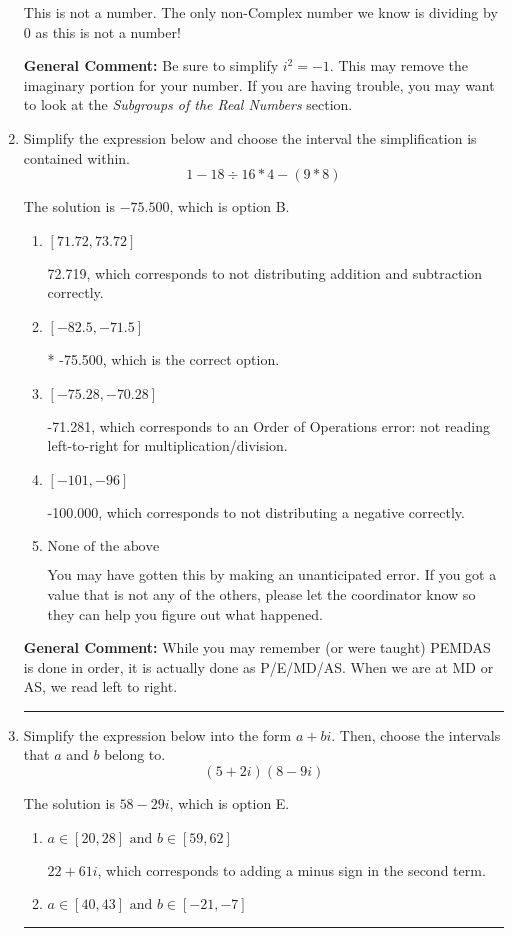 \documentclass{extbook}[14pt]
\newcommand{\litem}[1]{\item #1

\rule{\textwidth}{0.4pt}}
\begin{document}
\begin{enumerate}
{\begin{enumerate}[label=\Alph*.]
This is not a number. The only non-Complex number we know is dividing by 0 as this is not a number!
\end{enumerate}

\textbf{General Comment:} Be sure to simplify $i^2 = -1$. This may remove the imaginary portion for your number. If you are having trouble, you may want to look at the \textit{Subgroups of the Real Numbers} section.
}
\litem{
Simplify the expression below and choose the interval the simplification is contained within.
\[ 1 - 18 \div 16 * 4 - (9 * 8) \]

The solution is \( -75.500 \), which is option B.\begin{enumerate}[label=\Alph*.]
\item \( [71.72, 73.72] \)

 72.719, which corresponds to not distributing addition and subtraction correctly.
\item \( [-82.5, -71.5] \)

* -75.500, which is the correct option.
\item \( [-75.28, -70.28] \)

 -71.281, which corresponds to an Order of Operations error: not reading left-to-right for multiplication/division.
\item \( [-101, -96] \)

 -100.000, which corresponds to not distributing a negative correctly.
\item \( \text{None of the above} \)

 You may have gotten this by making an unanticipated error. If you got a value that is not any of the others, please let the coordinator know so they can help you figure out what happened.
\end{enumerate}

\textbf{General Comment:} While you may remember (or were taught) PEMDAS is done in order, it is actually done as P/E/MD/AS. When we are at MD or AS, we read left to right.
}
\litem{
Simplify the expression below into the form $a+bi$. Then, choose the intervals that $a$ and $b$ belong to.
\[ (5 + 2 i)(8 - 9 i) \]

The solution is \( 58 - 29 i \), which is option E.\begin{enumerate}[label=\Alph*.]
\item \( a \in [20, 28] \text{ and } b \in [59, 62] \)

 $22 + 61 i$, which corresponds to adding a minus sign in the second term.
\item \( a \in [40, 43] \text{ and } b \in [-21, -7] \)


\end{enumerate}}
\end{enumerate}
\end{document}
